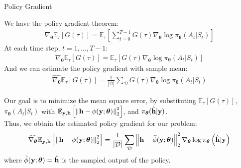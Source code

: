 \documentclass[hyperref={bookmarks=false}]{beamer}
\numberwithin{figure}{section}
\begin{document}
\begin{frame}[allowframebreaks]{Policy Gradient}

We have the policy gradient theorem:
\begin{align*}
    \nabla_{\boldsymbol{\theta}}\mathbb{E}_{\tau}[G(\tau)]
        =\mathbb{E}_{\tau}\left[\sum\limits_{t=0}^{T-1}G(\tau)
        \nabla_{\boldsymbol{\theta}}\log{\pi_{\boldsymbol{\theta}}
        (A_t|S_t)}\right]
\end{align*}
At each time step, $t=1,...,T-1$:
\begin{align*}
    \nabla_{\boldsymbol{\theta}}\mathbb{E}_{\tau}[G(\tau)]
        =\mathbb{E}_{\tau}\left[G(\tau)
        \nabla_{\boldsymbol{\theta}}\log{\pi_{\boldsymbol{\theta}}
        (A_t|S_t)}\right]
\end{align*}
And we can estimate the policy gradient with sample mean:
\begin{align*}
    \widehat{\nabla_{\boldsymbol{\theta}}}\mathbb{E}_{\tau}[G(\tau)]
        =\frac{1}{\left| \mathcal{D}  \right|} \sum\limits_{\mathcal{D}}
        G(\tau)\nabla_{\boldsymbol{\theta}}\log{\pi_{\boldsymbol{\theta}}
        (A_t|S_t)}
\end{align*}

\framebreak

Our goal is to minimize the mean square error, by substituting 
$\mathbb{E}_{\tau}[G(\tau)]$, $\pi_{\boldsymbol{\theta}}(A_t|S_t)$ with 
$\mathbb{E}_{{\bf y},{\bf h}}\left[\left\| {\bf h}-\phi(\mathbf{y};\boldsymbol{\theta}) \right\|^2_2 \right]$,
and $\pi_{\boldsymbol{\theta}}(\hat{{\bf h}}|{\bf y})$.\\
Thus, we obtain the estimated policy gradient for our problem:
\begin{equation} \label{policy gradient}
    \widehat{\nabla_{\boldsymbol{\theta}}}
            \mathbb{E}_{{\bf y},{\bf h}}\left[\left\| {\bf h}-\phi(\mathbf{y};\boldsymbol{\theta}) \right\|^2_2 \right]
            = \frac{1}{\left| \mathcal{D}  \right|} \sum\limits_{\mathcal{D}}
            \left\| {\bf h}-\widehat{\phi}(\mathbf{y};\boldsymbol{\theta}) \right\|^2_2
            \nabla_{\boldsymbol{\theta}}
            \log \pi_{\boldsymbol{\theta}}
            \left( \hat{{\bf h}}|{\bf y} \right)
\end{equation}
where $\hat{\phi}(\mathbf{y};\boldsymbol{\theta}) = 
\hat{{\bf h}}$ is the sampled output of the policy. 

\end{frame}
\end{document}
